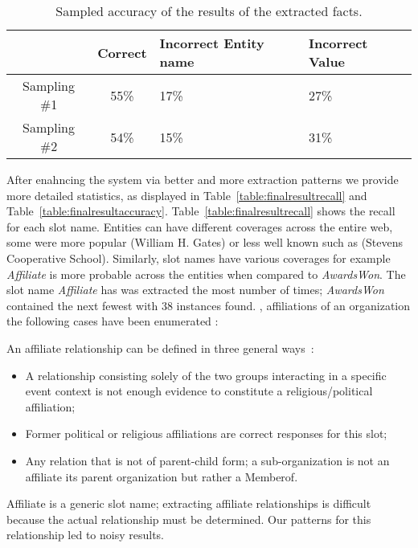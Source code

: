 \begin{table}
\caption{Sampled accuracy of the results of the extracted facts.}
\centering
\label{table:initialresult}

\begin{tabular}{| c | c | p{2cm} | p{13mm} |}
\hline 
 & \textbf{Correct} & \textbf{Incorrect Entity name} & \textbf{Incorrect Value} \\ 
\hline 
Sampling \#1 & 55\% & 17\% & 27\% \\ 
\hline Sampling \#2 & 54\% & 15\% & 31\%  \\ 
\hline 
\end{tabular} 
\end{table}


After enahncing the system via better and more extraction patterns  we provide more detailed statistics, as displayed in Table~\ref{table:finalresultrecall} and Table~\ref{table:finalresultaccuracy}.
Table~\ref{table:finalresultrecall} shows the recall for each slot name. 
Entities can have different coverages across the entire web, some were more popular (William H. Gates) or less well known such as (Stevens Cooperative School).
Similarly, slot names have various coverages for example \textit{Affiliate} is more probable across the entities when compared to \textit{AwardsWon}. %
The slot name \textit{Affiliate} has was extracted the most number of times; \textit{AwardsWon} contained the next fewest with 38 instances found. 
,  affiliations of an organization the following cases have been enumerated \cite{tackbp}: 

An affiliate relationship can be defined in three general ways~\cite{tackbp}:
\begin{itemize}
\item  A relationship consisting solely of the two groups
interacting in a specific event context is not enough evidence to constitute a religious/political affiliation; 
\item Former political or religious affiliations are correct responses for this slot;
\item  Any relation that is not of parent-child form; a sub-organization is not an affiliate its parent organization but rather a Memberof.
\end{itemize}
Affiliate is a generic slot name; extracting affiliate relationships is difficult because the actual relationship must be determined.
Our patterns for this relationship led to noisy results.

